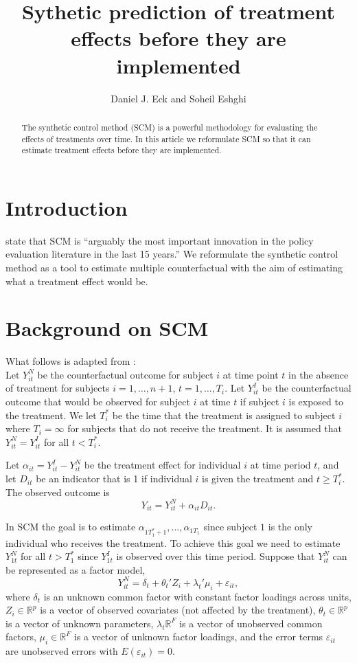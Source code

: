 \documentclass[11pt]{article}
\title{Sythetic prediction of treatment effects before they are implemented}
\author{Daniel J. Eck and Soheil Eshghi}
\newcommand{\R}{\mathbb{R}}
\newcommand{\Tstar}{T^{\textstyle{*}}}
\begin{document}
\maketitle

\begin{abstract}
The synthetic control method (SCM) is a powerful methodology for evaluating the effects of treatments over time. In this article we reformulate SCM so that it can estimate treatment effects before they are implemented. 
\end{abstract}


\section{Introduction}

\cite{athey2017state} state that SCM is ``arguably the most important innovation in the policy evaluation literature in the last 15 years.'' We reformulate the synthetic control method \citep{abadie2010synthetic} as a tool to estimate multiple counterfactual with the aim of estimating what a treatment effect would be. 





\section{Background on SCM}
What follows is adapted from \cite{abadie2010synthetic}: \\

Let $Y_{it}^N$ be the counterfactual outcome for subject $i$ at time point $t$ in the absence of treatment for subjects $i = 1,\ldots, n+1$, $t = 1,\ldots, T_i$.  Let $Y_{it}^I$ be the counterfactual outcome that would be observed for subject $i$ at time $t$ if subject $i$ is exposed to the treatment. We let $\Tstar_i$ be the time that the treatment is assigned to subject $i$ where $T_i = \infty$ for subjects that do not receive the treatment. It is assumed that $Y_{it}^N = Y_{it}^I$ for all $t < \Tstar_i$.

Let $\alpha_{it} = Y_{it}^I - Y_{it}^N$ be the treatment effect for individual $i$ at time period $t$, and let $D_{it}$ be an indicator that is 1 if individual $i$ is given the treatment and $t \geq \Tstar_i$. The observed outcome is 
$$
  Y_{it} = Y_{it}^N + \alpha_{it}D_{it}.
$$

In SCM the goal is to estimate $\alpha_{1\Tstar_1+1}, \ldots, \alpha_{1T_1}$ since subject $1$ is the only individual who receives the treatment. To achieve this goal we need to estimate $Y_{1t}^N$ for all $t > \Tstar_1$ since $Y_{1t}^I$ is observed over this time period. Suppose that $Y_{it}^N$ can be represented as a factor model,
$$
  Y_{it}^N = \delta_t + \theta_t'Z_i + \lambda_t'\mu_i + \varepsilon_{it}, 
$$
where $\delta_t$ is an unknown common factor with constant factor loadings across units, $Z_i \in \R^p$ is a vector of observed covariates (not affected by the treatment), $\theta_t \in \R^p$ is a vector of unknown parameters, $\lambda_t \R^F$ is a  vector of unobserved common factors, $\mu_i \in \R^F$ is a vector of unknown factor loadings, and the error terms $\varepsilon_{it}$ are unobserved errors with $E(\varepsilon_{it}) = 0$.
\end{document}
